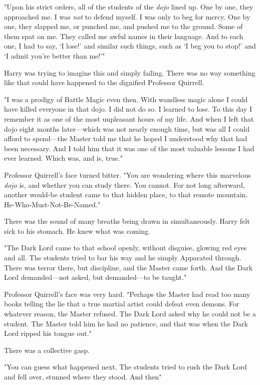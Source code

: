 "Upon his strict orders, all of the students of the \emph{dojo} lined up. One
by one, they approached me. I was \emph{not} to defend myself. I was only to
beg for mercy. One by one, they slapped me, or punched me, and pushed me to the
ground. Some of them spat on me. They called me awful names in their language.
And to each one, I had to say, `I lose!' and similar such things, such as `I
beg you to stop!' and `I admit you're better than me!'"

Harry was trying to imagine this and simply failing. There was no way something
like that could have happened to the dignified Professor Quirrell.

"I was a prodigy of Battle Magic even then. With wandless magic alone I could
have killed everyone in that dojo. I did not do so. I learned to lose. To this
day I remember it as one of the most unpleasant hours of my life. And when I
left that dojo eight months later---which was not nearly enough time, but was
all I could afford to spend---the Master told me that he hoped I understood why
that had been necessary. And I told him that it was one of the most valuable
lessons I had ever learned. Which was, and is, true."

Professor Quirrell's face turned bitter. "You are wondering where this
marvelous \emph{dojo} is, and whether you can study there. You cannot. For not
long afterward, another would-be student came to that hidden place, to that
remote mountain. He-Who-Must-Not-Be-Named."

There was the sound of many breaths being drawn in simultaneously. Harry felt
sick to his stomach. He knew what was coming.

"The Dark Lord came to that school openly, without disguise, glowing red eyes
and all. The students tried to bar his way and he simply Apparated through.
There was terror there, but discipline, and the Master came forth. And the Dark
Lord demanded---not asked, but demanded---to be taught."

Professor Quirrell's face was very hard. "Perhaps the Master had read too many
books telling the lie that a true martial artist could defeat even demons. For
whatever reason, the Master refused. The Dark Lord asked why he could not be a
student. The Master told him he had no patience, and that was when the Dark
Lord ripped his tongue out."

There was a collective gasp.

"You can guess what happened next. The students tried to rush the Dark Lord and
fell over, stunned where they stood. And then{\el}"

